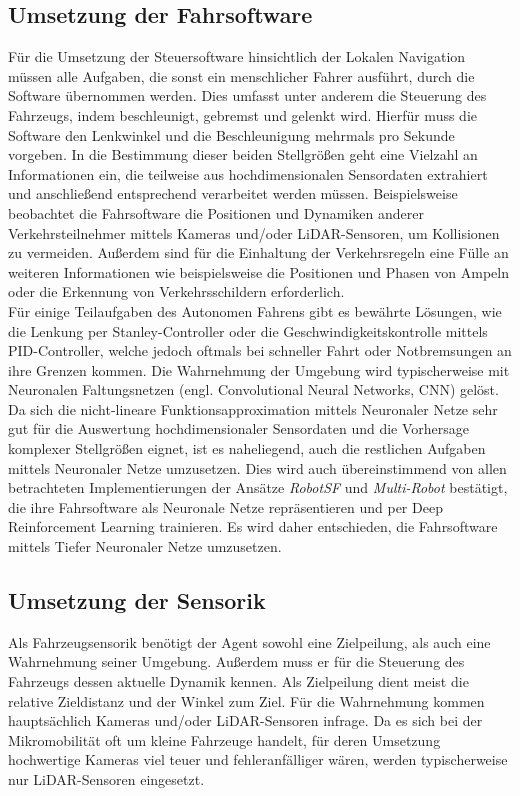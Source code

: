 \subsection{Umsetzung der Fahrsoftware}
Für die Umsetzung der Steuersoftware hinsichtlich der Lokalen Navigation müssen alle
Aufgaben, die sonst ein menschlicher Fahrer ausführt, durch die Software übernommen werden.
Dies umfasst unter anderem die Steuerung des Fahrzeugs, indem beschleunigt, gebremst und
gelenkt wird. Hierfür muss die Software den Lenkwinkel und die Beschleunigung mehrmals pro
Sekunde vorgeben. In die Bestimmung dieser beiden Stellgrößen geht eine Vielzahl an Informationen
ein, die teilweise aus hochdimensionalen Sensordaten extrahiert und anschließend entsprechend
verarbeitet werden müssen. Beispielsweise beobachtet die Fahrsoftware die Positionen und
Dynamiken anderer Verkehrsteilnehmer mittels Kameras und/oder LiDAR-Sensoren, um Kollisionen
zu vermeiden. Außerdem sind für die Einhaltung der Verkehrsregeln eine Fülle an weiteren
Informationen wie beispielsweise die Positionen und Phasen von Ampeln oder die Erkennung
von Verkehrsschildern erforderlich.\\

Für einige Teilaufgaben des Autonomen Fahrens gibt es bewährte Lösungen, wie die Lenkung
per Stanley-Controller oder die Geschwindigkeitskontrolle mittels PID-Controller,
welche jedoch oftmals bei schneller Fahrt oder Notbremsungen an ihre Grenzen kommen.
Die Wahrnehmung der Umgebung wird typischerweise mit Neuronalen Faltungsnetzen
(engl. Convolutional Neural Networks, CNN) gelöst. Da sich die nicht-lineare
Funktionsapproximation mittels Neuronaler Netze sehr gut für die Auswertung hochdimensionaler
Sensordaten und die Vorhersage komplexer Stellgrößen eignet, ist es naheliegend, auch die
restlichen Aufgaben mittels Neuronaler Netze umzusetzen. Dies wird auch übereinstimmend
von allen betrachteten Implementierungen der Ansätze \emph{RobotSF} und \emph{Multi-Robot}
bestätigt, die ihre Fahrsoftware als Neuronale Netze repräsentieren und per Deep
Reinforcement Learning trainieren. Es wird daher entschieden, die Fahrsoftware mittels
Tiefer Neuronaler Netze umzusetzen.

\subsection{Umsetzung der Sensorik}
Als Fahrzeugsensorik benötigt der Agent sowohl eine Zielpeilung, als auch eine Wahrnehmung
seiner Umgebung. Außerdem muss er für die Steuerung des Fahrzeugs dessen aktuelle Dynamik
kennen. Als Zielpeilung dient meist die relative Zieldistanz und der Winkel zum Ziel.
Für die Wahrnehmung kommen hauptsächlich Kameras und/oder LiDAR-Sensoren infrage.
Da es sich bei der Mikromobilität oft um kleine Fahrzeuge handelt, für deren Umsetzung
hochwertige Kameras viel teuer und fehleranfälliger wären, werden typischerweise
nur LiDAR-Sensoren eingesetzt.\\

